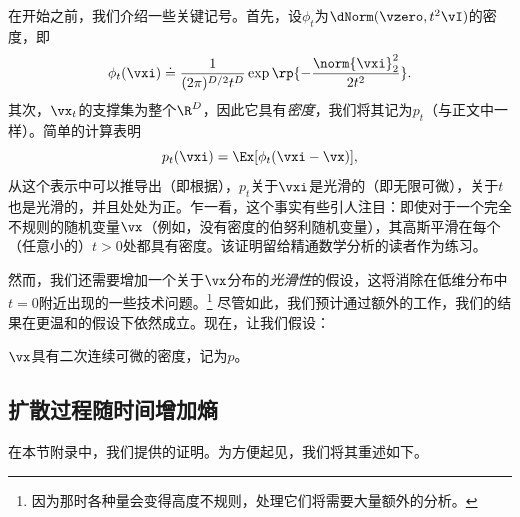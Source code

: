 \documentclass[../../book-main_zh.tex]{subfiles}
\begin{document}
在开始之前，我们介绍一些关键记号。首先，设\(\phi_{t}\)为\(\dNorm(\vzero, t^{2}\vI)\)的密度，即
\begin{equation}\label{eq:gaussian_noise_time_t}
    \phi_{t}(\vxi) \doteq
    \frac{1}{(2\pi)^{D/2}t^{D}}\exp\rp{-\frac{\norm{\vxi}_{2}^{2}}{2t^{2}}}.
\end{equation}
其次，\(\vx_{t}\)的支撑集为整个\(\R^{D}\)，因此它具有\textit{密度}，我们将其记为\(p_{t}\)（与正文中一样）。简单的计算表明
\begin{equation}\label{eq:p_t_representation}
    p_{t}(\vxi) = \Ex[\phi_{t}(\vxi - \vx)],
\end{equation}
从这个表示中可以推导出（即根据），\(p_{t}\)关于\(\vxi\)是光滑的（即无限可微），关于\(t\)也是光滑的，并且处处为正。乍一看，这个事实有些引人注目：即使对于一个完全不规则的随机变量\(\vx\)（例如，没有密度的伯努利随机变量），其高斯平滑在每个（任意小的）\(t > 0\)处都具有密度。该证明留给精通数学分析的读者作为练习。

然而，我们还需要增加一个关于\(\vx\)分布的\textit{光滑性}的假设，这将消除在低维分布中\(t = 0\)附近出现的一些技术问题。\footnote{因为那时各种量会变得高度不规则，处理它们将需要大量额外的分析。} 尽管如此，我们预计通过额外的工作，我们的结果在更温和的假设下依然成立。现在，让我们假设：
\begin{assumption}\label{assumption:entropy_x_density}
    \(\vx\)具有二次连续可微的密度，记为\(p\)。
\end{assumption}

\subsection{扩散过程随时间增加熵}\label{sub:diffusion_entropy_increases}

在本节附录中，我们提供的证明。为方便起见，我们将其重述如下。
\end{document}
